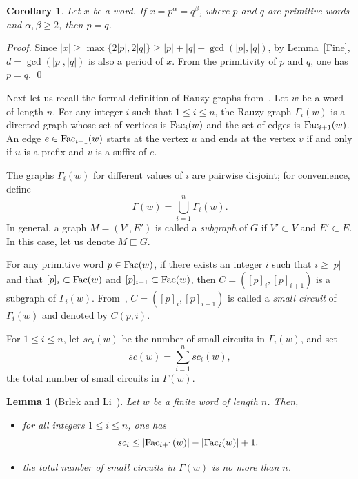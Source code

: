 \documentclass[runningheads,envcountsame,a4paper]{llncs}
\newtheorem{cor}[thm]{Corollary}
\newtheorem{lem}[thm]{Lemma}
\newcommand{\fac}{\hbox{\rm Fac}}
\begin{document}
\begin{cor}\label{lem:unique-primitive-root}
Let $x$ be a word. If $x=p^\alpha=q^\beta$, where \(p\) and \(q\) are primitive words and \(\alpha,\beta\ge 2\), then
\(p=q\).
\end{cor}

\begin{proof}
Since $|x|\ge \max\{2|p|,2|q|\}\ge |p|+|q|-\gcd(|p|,|q|)$,
by Lemma~\ref{Fine}, \(d=\gcd(|p|,|q|)\) is also a period of \(x\).
From the primitivity of $p$ and $q$, one has \(p=q\). \qed
\end{proof}

Next let us recall the formal definition of Rauzy graphs from~\cite{Rauzy}. Let $w$ be a word of length $n$. For any integer $i$ such that $1\leq i\leq n$, the Rauzy graph $\Gamma_i(w)$ is a directed graph whose set of vertices is $\fac_i(w)$ and the set of edges is $\fac_{i+1}(w)$.
An edge $e \in \fac_{i+1}(w)$ starts at the vertex $u$ and ends at the vertex $v$ if and only if $u$ is a prefix and $v$ is a suffix of $e$. 

The graphs $\Gamma_i(w)$ for different values of $i$ are pairwise disjoint; for convenience, define
\[
\Gamma(w)=\bigcup_{i=1}^{n}\Gamma_i(w).
\]
In general, a graph $M=(V', E')$ is called a \emph{subgraph} of $G$ if $V' \subset V$ and $E' \subset E$. In this case, let us denote $M \sqsubset G$.

For any primitive word $p \in \fac(w)$, if there exists an integer $i$ such that $i \geq |p|$ and that $[p]_i \subset \fac(w)$ and $[p]_{i+1} \subset \fac(w)$, then $C=([p]_{i},[p]_{i+1})$ is a subgraph of $\Gamma_i(w)$. From~\cite{sq}, $C=([p]_{i},[p]_{i+1})$ is called a {\em small circuit} of $\Gamma_i(w)$ and denoted by $C(p,i)$.

For $1\le i\le n$, let $sc_i(w)$ be the number of small circuits in $\Gamma_i(w)$, and set~\cite{sq}
\[
sc(w)=\sum_{i=1}^n sc_i(w),
\]
the total number of small circuits in $\Gamma(w)$.


\begin{lem}[{\rm Brlek and Li~\cite{sq}}]
\label{total-number}
Let $w$ be a finite word of length $n$. Then, 
\begin{itemize}
    \item[1.] for all integers $1\leq i\leq n$, one has 
$$sc_i\le |\fac_{i+1}(w)|-|\fac_i(w)|+1.$$
    \item[2.] the total number of small circuits in $\Gamma(w)$ is no more than $n$.
\end{itemize}
\end{lem}
\end{document}
